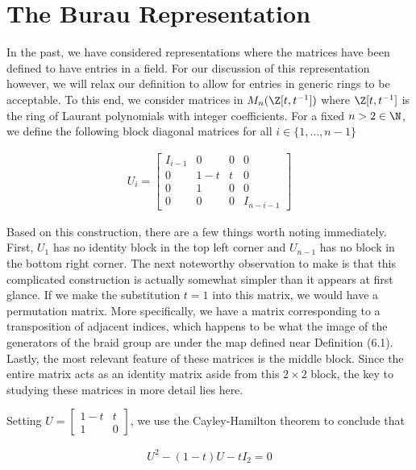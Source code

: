 \section{The Burau Representation}


In the past, we have considered representations where the matrices have been defined to have entries in a field. For our discussion of this representation however, we will relax our definition to allow for entries in generic rings to be acceptable. To this end, we consider matrices in $M_n(\Z[t,t^{-1}])$ where $\Z[t,t^{-1}]$ is the ring of Laurant polynomials with integer coefficients. For a fixed $n>2\in\N$, we define the following block diagonal matrices for all $i\in \{1,\hdots,n-1\}$

\begin{equation}
\begin{aligned}
U_i = \begin{bmatrix}
			I_{i-1}& 0 & 0 & 0 \\
			0 & 1-t & t & 0\\
			0 & 1 & 0 & 0\\
			0 & 0 & 0 & I_{n-i-1}
		\end{bmatrix}
\end{aligned}
\end{equation}

Based on this construction, there are a few things worth noting immediately. First, $U_1$ has no identity block in the top left corner and $U_{n-1}$ has no block in the bottom right corner. The next noteworthy observation to make is that this complicated construction is actually somewhat simpler than it appears at first glance. If we make the substitution $t=1$ into this matrix, we would have a permutation matrix. More specifically, we have a matrix corresponding to a transposition of adjacent indices, which happens to be what the image of the generators of the braid group are under the map defined near Definition (6.1). Lastly, the most relevant feature of these matrices is the middle block. Since the entire matrix acts as an identity matrix aside from this $2\times 2$ block, the key to studying these matrices in more detail lies here.

Setting $U= \begin{bmatrix} 1-t & t\\1 & 0 \end{bmatrix}$, we use the Cayley-Hamilton theorem to conclude that

\begin{equation}
\begin{aligned}
	U^2 - (1-t)U - tI_2 = 0
\end{aligned}
\end{equation}


